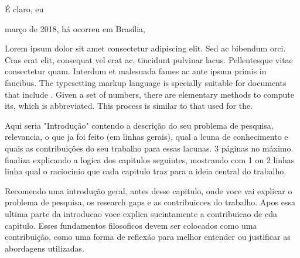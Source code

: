 \documentclass[./main.tex]{subfiles}
\begin{document}
É claro, eu 

março de 2018, há  ocorreu em Brasília, 

\par Lorem ipsum dolor sit amet consectetur adipiscing elit. Sed ac bibendum orci. Cras erat elit, consequat vel erat ac, tincidunt pulvinar lacus. Pellentesque vitae consectetur quam. Interdum et malesuada fames ac ante ipsum primis in faucibus. The typesetting markup language is specially suitable for documents that include . Given a set of numbers, there are elementary methods to compute its, which is abbreviated. This process is similar to that used for the.


Aqui seria "Introdução"  contendo a descrição do seu problema de pesquisa, relevancia, o que ja foi feito (em linhas gerais), qual a lcuna de conhecimento e quais as contribuições do seu trabalho para essas lacunas. 3 páginas no máximo. finaliza explicando a logica dos capitulos seguintes, mostrando com 1 ou 2 linhas linha qual o raciocinio que cada capitulo traz para a ideia central do trabalho.

Recomendo uma introdução geral, antes desse capitulo, onde voce vai explicar o problema de pesquisa, os research gaps e as contribuicoes do trabalho. Apos essa ultima parte da introducao voce explica sucintamente a contribuicao de cda capitulo. Esses fundamentos filosoficos devem ser colocados como uma contribuição, como uma forma de reflexão para melhor entender ou justificar as abordagens utilizadas.
\end{document}
